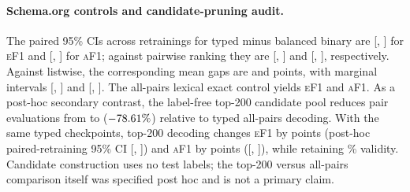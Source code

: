 \documentclass[11pt]{article}
\newcommand{\ef}{\textsc{eF1}}
\newcommand{\af}{\textsc{aF1}}
\begin{document}
\paragraph{Schema.org controls and candidate-pruning audit.}
The paired 95\% CIs across retrainings for typed minus balanced binary are
[\SchemaTransferSchemaTypedMinusBinaryEdgeLow, \SchemaTransferSchemaTypedMinusBinaryEdgeHigh] for
\ef{} and [\SchemaTransferSchemaTypedMinusBinaryAncestorLow,
\SchemaTransferSchemaTypedMinusBinaryAncestorHigh] for \af{}; against pairwise ranking they
are [\SchemaTransferSchemaTypedMinusPairwiseEdgeLow, \SchemaTransferSchemaTypedMinusPairwiseEdgeHigh]
and [\SchemaTransferSchemaTypedMinusPairwiseAncestorLow,
\SchemaTransferSchemaTypedMinusPairwiseAncestorHigh], respectively.
Against listwise, the corresponding mean gaps are
\RobustSchemaTypedMinusListwiseEdge{} and
\RobustSchemaTypedMinusListwiseAncestor{} points, with marginal intervals
[\RobustSchemaTypedMinusListwiseEdgeLow,
\RobustSchemaTypedMinusListwiseEdgeHigh] and
[\RobustSchemaTypedMinusListwiseAncestorLow,
\RobustSchemaTypedMinusListwiseAncestorHigh].
The all-pairs lexical exact control yields \SchemaLexicalEdge{} \ef{} and
\SchemaLexicalAncestor{} \af{}. As a post-hoc secondary contrast, the
label-free top-200 candidate pool reduces pair evaluations from
\SchemaTransferSchemaAllPairs{} to \SchemaTransferSchemaTopPairs{} ($-78.61\%$) relative
to typed all-pairs decoding. With the same typed checkpoints, top-200 decoding
changes \ef{} by \SchemaTransferTopVsAllEdge{} points (post-hoc paired-retraining 95\% CI
[\SchemaTransferTopVsAllEdgeLow, \SchemaTransferTopVsAllEdgeHigh]) and \af{} by
\SchemaTransferTopVsAllAncestor{} points
([\SchemaTransferTopVsAllAncestorLow, \SchemaTransferTopVsAllAncestorHigh]), while retaining
\SchemaTransferSchemaValid\% validity. Candidate construction uses no test labels; the
top-200 versus all-pairs comparison itself was specified post hoc and is not a
primary claim.
\end{document}
